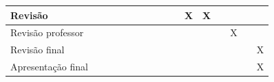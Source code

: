 \begin{table}[H]
\begin{tabular}{|p{2.5cm}|p{0.5cm}|p{0.5cm}|p{0.5cm}|p{0.5cm}|p{0.5cm}|p{0.5cm}|p{0.5cm}|p{0.5cm}|p{0.5cm}|p{0.5cm}|p{0.5cm}|p{0.5cm}|p{0.5cm}|p{0.5cm}|p{0.5cm}|}
Revisão               &                           &                           &                           &                           &                           &                           &                           &                           &                           & \cellcolor{blue}X & \cellcolor{blue}X &       &                           &       &                           \\ \hline
Revisão professor     &                           &                           &                           &                           &                           &                           &                           &                           &                           &                           &                           &       & \cellcolor{blue}X &       &                           \\ \hline
Revisão final         &                           &                           &                           &                           &                           &                           &                           &                           &                           &                           &                           &       &                           &       & \cellcolor{blue}X \\ \hline
Apresentação final    &                           &                           &                           &                           &                           &                           &                           &                           &                           &                           &                           &       &                           &       & \cellcolor{blue}X \\ \hline
\end{tabular}
  \label{tab:cronograma3}
\end{table}
